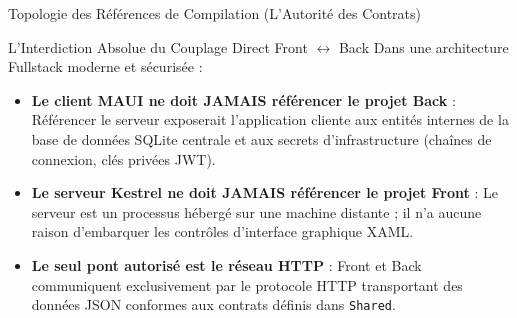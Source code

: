 \documentclass[a4paper,11pt]{report}
\begin{document}
\begin{schemabox}{Topologie des Références de Compilation (L'Autorité des Contrats)}
\begin{center}
\end{center}
\end{schemabox}

\vspace{0.2cm}

\begin{bestpracticebox}{L'Interdiction Absolue du Couplage Direct Front $\leftrightarrow$ Back}
Dans une architecture Fullstack moderne et sécurisée :
\begin{itemize}
    \item \textbf{Le client MAUI ne doit JAMAIS référencer le projet Back} : Référencer le serveur exposerait l'application cliente aux entités internes de la base de données SQLite centrale et aux secrets d'infrastructure (chaînes de connexion, clés privées JWT).
    \item \textbf{Le serveur Kestrel ne doit JAMAIS référencer le projet Front} : Le serveur est un processus hébergé sur une machine distante ; il n'a aucune raison d'embarquer les contrôles d'interface graphique XAML.
    \item \textbf{Le seul pont autorisé est le réseau HTTP} : Front et Back communiquent exclusivement par le protocole HTTP transportant des données JSON conformes aux contrats définis dans \texttt{Shared}.
\end{itemize}
\end{bestpracticebox}
\end{document}
